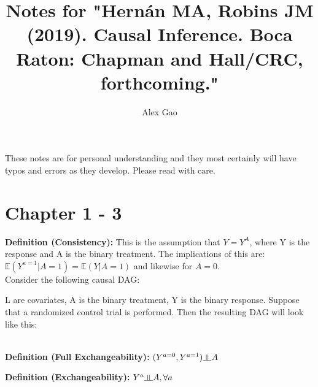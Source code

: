 \documentclass[10pt]{article}
\newcommand{\E}{\mathbb{E}}
\newcommand{\indep}{\rotatebox[origin=c]{90}{$\models$}}
\begin{document}
\title{\LARGE \bf Notes for "Hernán MA, Robins JM (2019). Causal Inference. Boca Raton: Chapman and Hall/CRC, forthcoming."} 
\author{Alex Gao }
\date{}

\maketitle
\vspace{-0.6in}

These notes are for personal understanding and they most certainly will have typos and errors as they develop. Please read with care.

\section{Chapter 1 - 3}

\textbf{Definition (Consistency):} This is the assumption that $Y = Y^A$, where Y is the response and A is the binary treatment. The implications of this are: $\E (Y^{a=1} | A = 1) = \E (Y | A = 1)$ and likewise for $A = 0$.\\

Consider the following causal DAG:\\


L are covariates, A is the binary treatment, Y is the binary response. Suppose that a randomized control trial is performed. Then the resulting DAG will look like this:\\

\\

\noindent \textbf{Definition (Full Exchangeability):} $(Y^{a=0}, Y^{a=1}) \indep A$
	
\noindent \textbf{Definition (Exchangeability):} $Y^a \indep A, \forall a$
\end{document}
